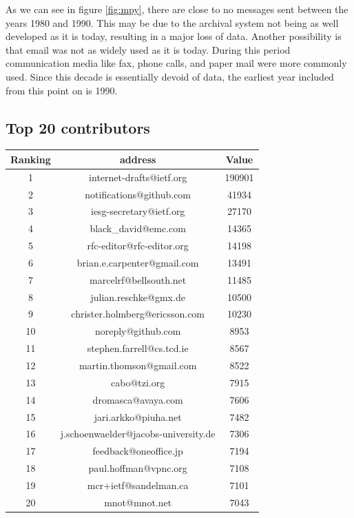 \documentclass[a4paper,english]{report}
\begin{document}
As we can see in figure \ref{fig:mpy}, there are close to no messages sent between the years 1980 and 1990. This may be due to the archival system not being as well developed as it is today, resulting in a major loss of data. Another possibility is that email was not as widely used as it is today. During this period communication media like fax, phone calls, and paper mail were more commonly used.
Since this decade is essentially devoid of data, the earliest year included from this point on is 1990.






\subsection{Top 20 contributors}

\begin{center}
 \begin{tabular}{|c | c | c|}
 \hline
Ranking & address & Value \\ [0.5ex]
 \hline\hline
 1 & internet-drafts@ietf.org & 190901\\
  \hline
 2 & notifications@github.com & 41934\\
  \hline
 3 & iesg-secretary@ietf.org & 27170\\
  \hline
 4 & black\_david@emc.com & 14365\\
  \hline
 5 & rfc-editor@rfc-editor.org & 14198\\
  \hline
 6 & brian.e.carpenter@gmail.com & 13491\\
  \hline
 7 & marcelrf@bellsouth.net & 11485\\
  \hline
 8 & julian.reschke@gmx.de & 10500\\
  \hline
 9 & christer.holmberg@ericsson.com & 10230\\
  \hline
 10 & noreply@github.com & 8953\\
  \hline
 11 & stephen.farrell@cs.tcd.ie & 8567\\
  \hline
 12 & martin.thomson@gmail.com & 8522\\
  \hline
 13 & cabo@tzi.org & 7915\\
  \hline
 14 & dromasca@avaya.com & 7606\\
  \hline
 15 & jari.arkko@piuha.net & 7482\\
  \hline
 16 & j.schoenwaelder@jacobs-university.de & 7306\\
  \hline
 17 & feedback@oneoffice.jp & 7194\\
  \hline
 18 & paul.hoffman@vpnc.org & 7108\\
  \hline
 19 & mcr+ietf@sandelman.ca & 7101\\
  \hline
 20 & mnot@mnot.net & 7043\\
  \hline
\end{tabular}
\end{center}
\end{document}
